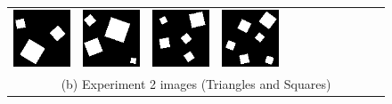 \documentclass[letterpaper]{article} %
\begin{document}
\begin{figure}[!htbp]
\begin{tabular}{cccccccccccc}
\multicolumn{1}{c}{\includegraphics[width=0.125\columnwidth]{images/square_3.png}} \hspace{-12pt} & 
\multicolumn{1}{c}{\includegraphics[width=0.125\columnwidth]{images/square_4.png}} \hspace{-12pt} & 
\multicolumn{1}{c}{\includegraphics[width=0.125\columnwidth]{images/square_5.png}} \hspace{-12pt} & 
\multicolumn{1}{c}{\includegraphics[width=0.125\columnwidth]{images/square_6.png}} \\ 
\multicolumn{12}{c}{(b) Experiment 2 images (Triangles and Squares)} \\


\end{tabular}
\end{figure}
\end{document}

